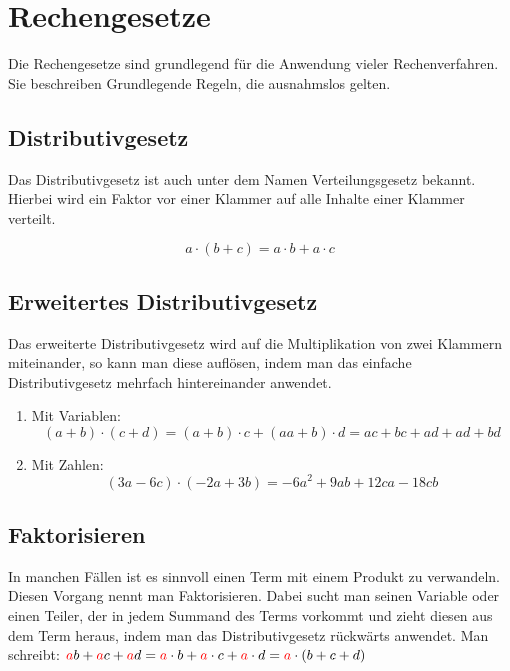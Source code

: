 
\section{Rechengesetze}\label{sec:Rechengesetzte}
Die Rechengesetze sind grundlegend für die Anwendung vieler Rechenverfahren. Sie beschreiben Grundlegende Regeln, die ausnahmslos gelten.

\subsection{Distributivgesetz}\label{sec:Distributivgesetzt}
Das Distributivgesetz ist auch unter dem Namen Verteilungsgesetz bekannt. Hierbei wird ein Faktor vor einer Klammer auf alle Inhalte einer Klammer verteilt. 

\begin{beispiel}
	\[a\cdot(b+c)=a\cdot b+a\cdot c\]
\end{beispiel}
\subsection{Erweitertes Distributivgesetz}\label{sec:Erweitertes Distributivgesetz}
Das erweiterte Distributivgesetz wird auf die Multiplikation von zwei Klammern miteinander, so kann man diese auflösen, indem man das einfache Distributivgesetz mehrfach hintereinander anwendet. 

\begin{beispiel}
	\begin{enumerate}
		\item Mit Variablen: \[(a+b)\cdot(c+d)=(a+b)\cdot c+(aa+b)\cdot d=ac+bc+ad+ad+bd\]
		\item Mit Zahlen: \[(3a-6c)\cdot (-2a+3b)=-6a^2+9ab+12ca-18cb\]
	\end{enumerate}
\end{beispiel}
\pagebreak
\subsection{Faktorisieren}\label{sec:Faktorisieren}
In manchen Fällen ist es sinnvoll einen Term mit einem Produkt zu verwandeln. Diesen Vorgang nennt man Faktorisieren. Dabei sucht man seinen Variable oder einen Teiler, der in jedem Summand des Terms vorkommt und zieht diesen aus dem Term heraus, indem man das Distributivgesetz rückwärts anwendet.
Man schreibt: $\color {red}a\color {black}b+\color {red}a\color {black}c+\color {red}a\color {black}d=\color {red}a\color {black}\cdot b+\color {red}a\color {black}\cdot c+\color {red}a\color {black}\cdot d=\color {red}a\color {black}\cdot(b+c+d)$

